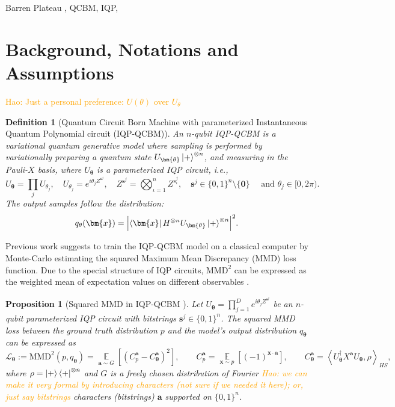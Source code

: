\documentclass[a4paper,onecolumn,notitlepage,nofootinbib,longbibliography,superscriptaddress, floatfix, pra, aps, 10pt]{revtex4-2}
\newcommand{\inner}[2]{\left\langle #1, #2 \right\rangle}
\newcommand{\vttheta}{{\bm{\theta}}}
\newcommand{\vta}{{\bm{a}}}
\newcommand{\vtx}{{\bm{x}}}
\newcommand{\vtsj}{{\bm{s}^j}}
\newtheorem{proposition}{Proposition}
\newtheorem{definition}{Definition}
\newcommand\hw[1]{\textcolor{orange}{Hao: #1}}
\begin{document}
Barren Plateau \cite{mcclean_barren_2018, ragone_lie_2024, PRXQuantum.3.010313, Cerezo2021CostFunctionBP, Grant2019InitializationBP, Cerezo2025ProvableAbsenceBP},
QCBM, IQP, 

\section{Background, Notations and Assumptions}
\hw{Just a personal preference: $U(\theta)$ over $U_{\theta}$}
\begin{definition}[Quantum Circuit Born Machine with parameterized Instantaneous Quantum Polynomial circuit (IQP-QCBM)]
\label{def: IQP}
An $n$-qubit IQP-QCBM is a variational quantum generative model where sampling is performed by variationally preparing a quantum state $U_\vttheta \ket{+}^{\otimes n}$, and measuring in the Pauli-$X$ basis, where $U_\vttheta$ is a parameterized IQP circuit, i.e., 
\begin{equation}
U_\vttheta = \prod_j U_{\theta_j}, \quad U_{\theta_j} = e^{i\theta_j Z^{\vtsj}}, \quad Z^{\vtsj} = \bigotimes_{\iota=1}^n Z^{s^j_\iota}, \quad \vtsj \in \{0,1\}^n \setminus \{\mathbf{0}\} \quad \text{ and }\theta_j\in[0, 2\pi).\end{equation} The output samples follow the distribution: \begin{equation}
    q_{\theta}(\vtx) = \abs{\bra{\vtx} H^{\otimes n} U_\vttheta \ket{+}^{\otimes n}}^2.
\end{equation}
\end{definition}

Previous work \cite{recio2025train, recioarmengol2025iqpoptfastoptimizationinstantaneous} suggests to train the IQP-QCBM model on a classical computer by Monte-Carlo estimating the squared Maximum Mean Discrepancy (MMD) loss function. Due to the special structure of IQP circuits, $\text{MMD}^2$ can be expressed as the weighted mean of expectation values on different observables \cite{rudolph2024trainability, recio2025train}.


\begin{proposition} [Squared MMD in IQP-QCBM \cite{rudolph2024trainability, recio2025train}]
Let $U_\vttheta = \prod_{j=1}^D e^{i \theta_j Z^\vtsj}$ be an $n$-qubit parameterized IQP circuit with
bitstrings $\vtsj \in \{0,1\}^n$. The squared MMD loss between the ground truth distribution $p$ and the model's output distribution $q_\vttheta$ can be expressed as 
\begin{equation}
    \mathcal{L}_\vttheta := \text{MMD}^2(p, q_\vttheta) = \operatorname*{\mathbb{E}}_{\vta \sim G} \left[ \left( C^\vta_p - C^\vta_\vttheta \right)^2 \right], \qquad C^\vta_p  = \operatorname*{\mathbb{E}}_{\vtx \sim p}[(-1)^{\vtx \cdot \vta}], \qquad C^\vta_\vttheta=\inner{U_\vttheta^\dagger X^{\vta}U_\vttheta}{\rho }_{HS},
\end{equation}
where $\rho = \ket{+}\bra{+}^{\otimes n}$ and $G$ is a freely chosen distribution of Fourier \hw{we can make it very formal by introducing characters (not sure if we needed it here); or, just say bitstrings} characters (bitstrings) $\vta$ supported on $\{0,1\}^n$.
\end{proposition}
\end{document}
